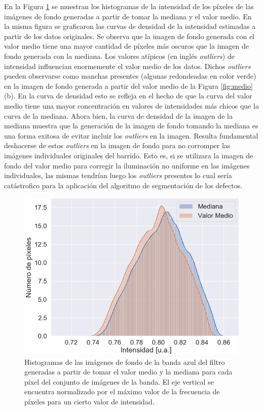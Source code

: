 En la Figura \ref{fig:comparhists} se muestran los histogramas de la intensidad de los píxeles de las imágenes de fondo generadas a partir de tomar la mediana y el valor medio. En la misma figura se graficaron las curvas de densidad de la intensidad estimadas a partir de los datos originales. Se observa que la imagen de fondo generada con el valor medio tiene una mayor cantidad de píxeles más oscuros que la imagen de fondo generada con la mediana. Los valores atípicos (en inglés \textit{outliers}) de intensidad influencian enormemente el valor medio de los datos. Dichos \textit{outliers} pueden observarse como manchas presentes (algunas redondeadas en color verde) en la imagen de fondo generada a partir del valor medio de la Figura \ref{fig:medio} (b). En la curva de densidad esto se refleja en el hecho de que la curva del valor medio tiene una mayor concentración en valores de intensidades más chicos que la curva de la mediana. Ahora bien, la curva de densidad de la imagen de la mediana muestra que la generación de la imagen de fondo tomando la mediana es una forma exitosa de evitar incluir los \textit{outliers} en la imagen. Resulta fundamental deshacerse de estos \textit{outliers} en la imagen de fondo para no corromper las imágenes individuales originales del barrido. Esto es, si se utilizara la imagen de fondo del valor medio para corregir la iluminación no uniforme en las imágenes individuales, las mismas tendrían luego los \textit{outliers} presentes lo cual sería catástrofico para la aplicación del algoritmo de segmentación de los defectos.
\begin{figure}[H]
	\centering
\includegraphics[width=1.0\textwidth]{Figs/defectosZEISS/comparhistsmedi.png}
\caption{Histogramas de las imágenes de fondo de la banda azul del filtro generadas a partir de tomar el valor medio y la mediana para cada píxel del conjunto de imágenes de la banda. El eje vertical se encuentra normalizado por el máximo valor de la frecuencia de píxeles para un cierto valor de intensidad.}
\label{fig:comparhists}
\end{figure}	
	
